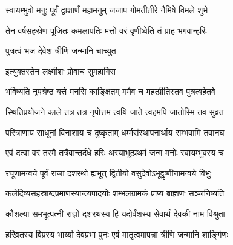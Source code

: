 

\storymeta



\twolineshloka
{स्वायम्भुवो मनुः पूर्वं द्वाशार्णं महामनुम्}
{जजाप गोमतीतीरे नैमिषे विमले शुभे}%

\twolineshloka
{तेन वर्षसहस्रेण पूजितः कमलापतिः}
{मत्तो वरं वृणीष्वेति तं प्राह भगवान्हरिः}%


\onelineshloka
{पुत्रत्वं भज देवेश त्रीणि जन्मानि चाच्युत}%


\onelineshloka
{इत्युक्तस्तेन लक्ष्मीशः प्रोवाच सुमहागिरा}%


\twolineshloka
{भविष्यति नृपश्रेष्ठ यत्ते मनसि काङ्क्षितम्}
{ममैव च महत्प्रीतिस्तव पुत्रत्वहेतवे}%

\twolineshloka
{स्थितिप्रयोजने काले तत्र तत्र नृपोत्तम}
{त्वयि जाते त्वहमपि जातोस्मि तव सुव्रत}%

\twolineshloka
{परित्राणाय साधूनां विनाशाय च दुष्कृताम्}
{धर्म्मसंस्थापनार्थाय सम्भवामि तवानघ}%


\twolineshloka
{एवं दत्वा वरं तस्मै तत्रैवान्तर्दधे हरिः}
{अस्याभूत्प्रथमं जन्म मनोः स्वायम्भुवस्य च}%

\twolineshloka
{रघूणामन्वये पूर्वं राजा दशरथो ह्यभूत्}
{द्वितीयो वसुदेवोऽभूद्वृष्णीनामन्वये विभुः}%

\twolineshloka
{कलेर्दिव्यसहस्राब्दप्रमाणस्यान्त्यपादयोः}
{शम्भलग्रामकं प्राप्य ब्राह्मणः सञ्जनिष्यति}%

\twolineshloka
{कौशल्या समभूत्पत्नी राज्ञो दशरथस्य हि}
{यदोर्वंशस्य सेवार्थं देवकी नाम विश्रुता}%

\twolineshloka
{हरिव्रतस्य विप्रस्य भार्य्या देवप्रभा पुनः}
{एवं मातृत्वमापन्ना त्रीणि जन्मानि शार्ङ्गिणः}%

